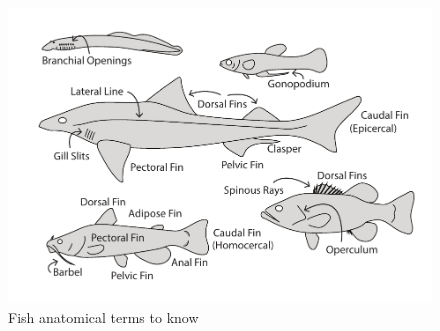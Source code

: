 \documentclass[a4paper,12pt]{article}
\begin{document}
\begin{figure}[H]
\centering
  \includegraphics{FishAnatomy.pdf}
  \caption{Fish anatomical terms to know}
  \label{fig:FishAnatomy}
\end{figure}
\end{document}
